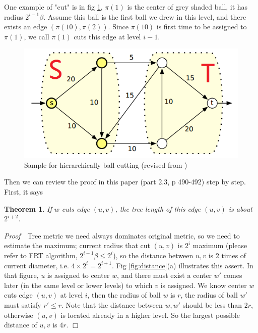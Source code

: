 \documentclass[11pt,twocolumn]{IEEEtran}
\newtheorem{Theorem}{Theorem}[section]
\begin{document}
One example of "cut" is in fig \ref{fig:cut}, $\pi(1)$ is the center of grey shaded ball, it has radius
$2^{i-1}\beta$. Assume this ball is the first ball we drew in this level, and there exists an edge
$(\pi(10),\pi(2))$. Since $\pi(10)$ is first time to be assigned to $\pi(1)$, we call $\pi(1)$ cuts
this edge at level $i-1$.

\begin{figure}[hbt]
	\begin{center}
	\includegraphics[scale=0.4]{cut.png}
	\end{center}
	\caption{Sample for hierarchically ball cutting (revised from \cite{thispaper})}
	\label{fig:cut}
\end{figure}

Then we can review the proof in this paper (part 2.3, p 490-492) step by step. First, it says 
\begin{Theorem}
If $w$ cuts
edge $(u,v)$, the tree length of this edge $(u,v)$ is about $2^{i+2}$.
\end{Theorem}

{\it Proof}\ \ 
Tree metric we need
always dominates original metric, so we need to estimate the maximum; current radius that cut $(u,v)$ is
$2^i$ maximum (please refer to FRT algorithm, $2^{i-1}\beta \leq 2^i$), so the distance between $u,v$ is
2 times of current diameter, i.e. $4\times 2^{i} = 2^{i+1}$. Fig \ref{fig:distance}(a) illustrates this
assert. 
In that figure, $u$ is assigned to center $w$, and there must exist a center $w'$ comes later (in the same
level or lower levels) to which $v$ is assigned. We know center $w$ cuts edge $(u,v)$ at level $i$,
then the radius of ball $w$ is $r$, the radius of ball $w'$ must satisfy $r'\leq r$. Note that
the distance between $w,w'$ should be less than $2r$, otherwise $(u,v)$ is located already in a higher level.
 So the largest possible distance of $u,v$ is $4r$.
$\Box$
\end{document}
